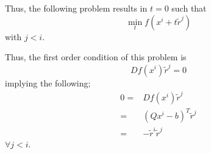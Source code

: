 \documentclass[letterpaper,12pt]{article}
\theoremstyle{definition}
\begin{document}
Thus, the following problem results in $t = 0$ such that
\[ \min_t f(x^{i} + t \tilde{r}^j)\] with $j < i$. 

Thus, the first order condition of this problem is\\
\[D f(x^{i}) \tilde{r}^{j} = 0\]
implying the following;
\begin{align*}
  0 =& D f(x^{i}) \tilde{r}^{j}  \\
    =& (Q x^i -b)^T \tilde{r}^j  \\
    =& -\tilde{r}^i \tilde{r}^j
\end{align*}
$\forall j < i$.  \\\\
\end{document}
